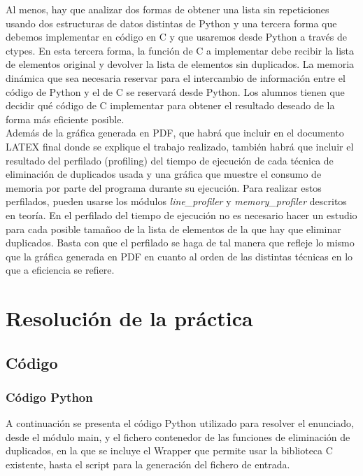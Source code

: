 \documentclass[12 pt]{article}
\begin{document}
Al menos, hay que analizar dos formas de obtener una lista sin repeticiones usando dos estructuras de
datos distintas de Python y una tercera forma que debemos implementar en código en C y que usaremos
desde Python a través de ctypes. En esta tercera forma, la función de C a implementar debe recibir la lista de elementos original y devolver la lista de elementos sin duplicados. La memoria dinámica que sea
necesaria reservar para el intercambio de información entre el código de Python y el de C se reservará
desde Python. Los alumnos tienen que decidir qué código de C implementar para obtener el resultado
deseado de la forma más eficiente posible.\\
\newpage
Además de la gráfica generada en PDF, que habrá que incluir en el documento LATEX final donde se
explique el trabajo realizado, también habrá que incluir el resultado del perfilado (profiling) del tiempo
de ejecución de cada técnica de eliminación de duplicados usada y una gráfica que muestre el consumo de
memoria por parte del programa durante su ejecución. Para realizar estos perfilados, pueden usarse los
módulos \emph{line\_profiler} y \emph{memory\_profiler} descritos en teoría. En el perfilado del tiempo de ejecución
no es necesario hacer un estudio para cada posible tamañoo de la lista de elementos de la que hay que
eliminar duplicados. Basta con que el perfilado se haga de tal manera que refleje lo mismo que la gráfica
generada en PDF en cuanto al orden de las distintas técnicas en lo que a eficiencia se refiere.

\section{Resolución de la práctica}
\subsection{Código}
\subsubsection{Código Python}
A continuación se presenta el código Python utilizado para resolver el enunciado, desde el módulo main, y el fichero contenedor de las funciones de eliminación de duplicados, en la que se incluye el Wrapper que permite usar la biblioteca C existente, hasta el script para la generación del fichero de entrada. 
\end{document}
